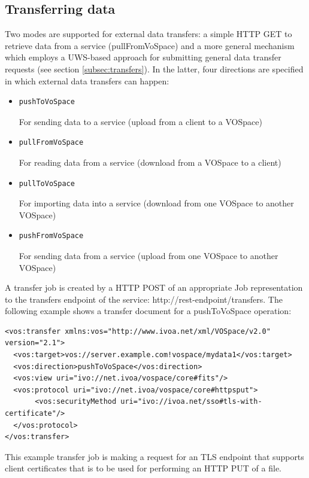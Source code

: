\documentclass[11pt,a4paper]{ivoa}
\begin{document}
\subsection{Transferring data}
\label{subsec:transferringdata}
Two modes are supported for external data transfers: a simple HTTP GET to retrieve data from a service (pullFromVoSpace) and a more general mechanism which employs a UWS-based approach \citep{std:UWS} for submitting general data transfer requests (see section \ref{subsec:transfers}). In the latter, four directions are specified in which external data transfers can happen:
\begin{itemize}
    \item \begin{verbatim}pushToVoSpace\end{verbatim} For sending data to a service (upload from a client to a VOSpace)
    \item \begin{verbatim}pullFromVoSpace\end{verbatim} For reading data from a service (download from a VOSpace to a client)
    \item \begin{verbatim}pullToVoSpace\end{verbatim} For importing data into a service (download from one VOSpace to another VOSpace)
    \item \begin{verbatim}pushFromVoSpace\end{verbatim} For sending data from a service (upload from one VOSpace to another VOSpace)
\end{itemize}

A transfer job is created by a HTTP POST of an appropriate Job representation to the transfers endpoint of the service: http://rest-endpoint/transfers.  The following example shows a transfer document for a pushToVoSpace operation:

\begin{lstlisting}
<vos:transfer xmlns:vos="http://www.ivoa.net/xml/VOSpace/v2.0" version="2.1">   
  <vos:target>vos://server.example.com!vospace/mydata1</vos:target>
  <vos:direction>pushToVoSpace</vos:direction>
  <vos:view uri="ivo://net.ivoa/vospace/core#fits"/>
  <vos:protocol uri="ivo://net.ivoa/vospace/core#httpsput">
       <vos:securityMethod uri="ivo://ivoa.net/sso#tls-with-certificate"/>
  </vos:protocol>
</vos:transfer>
\end{lstlisting}

This example transfer job is making a request for an TLS endpoint that supports client certificates that is to be used for performing an HTTP PUT of a file.  
\end{document}
